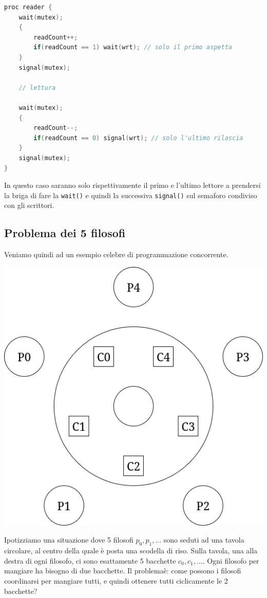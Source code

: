 \documentclass[a4paper,11pt]{article}
\begin{document}
\begin{lstlisting}[language=C++, style=codestyle]	
proc reader {
	wait(mutex);
	{
		readCount++;
		if(readCount == 1) wait(wrt); // solo il primo aspetta
	}
	signal(mutex);

	// lettura
	
	wait(mutex);
	{
		readCount--;
		if(readCount == 0) signal(wrt); // solo l'ultimo rilascia
	}
	signal(mutex);
}
\end{lstlisting}

In questo caso saranno solo rispettivamente il primo e l'ultimo lettore a prendersi la briga di fare la \lstinline|wait()| e quindi la successiva \lstinline|signal()| sul semaforo condiviso con gli scrittori.

\subsection{Problema dei 5 filosofi}
Veniamo quindi ad un esempio celebre di programmazione concorrente.

\begin{center}
	\includegraphics[scale=0.35]{../figures/filosofi.png}
\end{center}

Ipotizziamo una situazione dove 5 filosofi $p_0, p_1, ...$ sono seduti ad una tavola circolare, al centro della quale è posta una scodella di riso. Sulla tavola, una alla destra di ogni filosofo, ci sono esattamente 5 bacchette $c_0, c_1, ...$. Ogni filosofo per mangiare ha bisogno di due bacchette. Il problemaè: come possono i filosofi coordinarsi per mangiare tutti, e quindi ottenere tutti ciclicamente le 2 bacchette?
\end{document}
